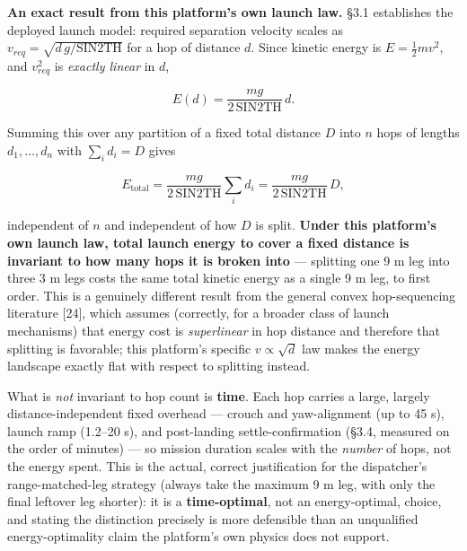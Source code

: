 \documentclass[conference]{IEEEtran}
\begin{document}
\textbf{An exact result from this platform's own launch law.} \S3.1 establishes the deployed launch model: required separation velocity scales as $v_{req} = \sqrt{d\,g/\mathrm{SIN2TH}}$ for a hop of distance $d$. Since kinetic energy is $E = \tfrac{1}{2}mv^2$, and $v_{req}^2$ is \emph{exactly linear} in $d$,

\begin{equation*}E(d) = \frac{mg}{2\,\mathrm{SIN2TH}}\,d.\end{equation*}

Summing this over any partition of a fixed total distance $D$ into $n$ hops of lengths $d_1, \dots, d_n$ with $\sum_i d_i = D$ gives

\begin{equation*}E_{\text{total}} = \frac{mg}{2\,\mathrm{SIN2TH}} \sum_i d_i = \frac{mg}{2\,\mathrm{SIN2TH}}\,D,\end{equation*}

independent of $n$ and independent of how $D$ is split. \textbf{Under this platform's own launch law, total launch energy to cover a fixed distance is invariant to how many hops it is broken into} --- splitting one 9 m leg into three 3 m legs costs the same total kinetic energy as a single 9 m leg, to first order. This is a genuinely different result from the general convex hop-sequencing literature [24], which assumes (correctly, for a broader class of launch mechanisms) that energy cost is \emph{superlinear} in hop distance and therefore that splitting is favorable; this platform's specific $v \propto \sqrt{d}$ law makes the energy landscape exactly flat with respect to splitting instead.

What is \emph{not} invariant to hop count is \textbf{time}. Each hop carries a large, largely distance-independent fixed overhead --- crouch and yaw-alignment (up to 45 s), launch ramp (1.2--20 s), and post-landing settle-confirmation (\S3.4, measured on the order of minutes) --- so mission duration scales with the \emph{number} of hops, not the energy spent. This is the actual, correct justification for the dispatcher's range-matched-leg strategy (always take the maximum 9 m leg, with only the final leftover leg shorter): it is a \textbf{time-optimal}, not an energy-optimal, choice, and stating the distinction precisely is more defensible than an unqualified energy-optimality claim the platform's own physics does not support.
\end{document}

